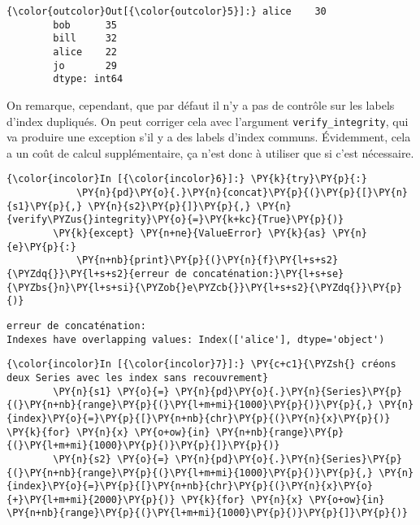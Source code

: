 \begin{Verbatim}[commandchars=\\\{\}]
{\color{outcolor}Out[{\color{outcolor}5}]:} alice    30
        bob      35
        bill     32
        alice    22
        jo       29
        dtype: int64
\end{Verbatim}
            
    On remarque, cependant, que par défaut il n'y a pas de contrôle sur les
labels d'index dupliqués. On peut corriger cela avec l'argument
\texttt{verify\_integrity}, qui va produire une exception s'il y a des
labels d'index communs. Évidemment, cela a un coût de calcul
supplémentaire, ça n'est donc à utiliser que si c'est nécessaire.

    \begin{Verbatim}[commandchars=\\\{\}]
{\color{incolor}In [{\color{incolor}6}]:} \PY{k}{try}\PY{p}{:}
            \PY{n}{pd}\PY{o}{.}\PY{n}{concat}\PY{p}{(}\PY{p}{[}\PY{n}{s1}\PY{p}{,} \PY{n}{s2}\PY{p}{]}\PY{p}{,} \PY{n}{verify\PYZus{}integrity}\PY{o}{=}\PY{k+kc}{True}\PY{p}{)}
        \PY{k}{except} \PY{n+ne}{ValueError} \PY{k}{as} \PY{n}{e}\PY{p}{:}
            \PY{n+nb}{print}\PY{p}{(}\PY{n}{f}\PY{l+s+s2}{\PYZdq{}}\PY{l+s+s2}{erreur de concaténation:}\PY{l+s+se}{\PYZbs{}n}\PY{l+s+si}{\PYZob{}e\PYZcb{}}\PY{l+s+s2}{\PYZdq{}}\PY{p}{)}
\end{Verbatim}


    \begin{Verbatim}[commandchars=\\\{\}]
erreur de concaténation:
Indexes have overlapping values: Index(['alice'], dtype='object')

    \end{Verbatim}

    \begin{Verbatim}[commandchars=\\\{\}]
{\color{incolor}In [{\color{incolor}7}]:} \PY{c+c1}{\PYZsh{} créons deux Series avec les index sans recouvrement}
        \PY{n}{s1} \PY{o}{=} \PY{n}{pd}\PY{o}{.}\PY{n}{Series}\PY{p}{(}\PY{n+nb}{range}\PY{p}{(}\PY{l+m+mi}{1000}\PY{p}{)}\PY{p}{,} \PY{n}{index}\PY{o}{=}\PY{p}{[}\PY{n+nb}{chr}\PY{p}{(}\PY{n}{x}\PY{p}{)} \PY{k}{for} \PY{n}{x} \PY{o+ow}{in} \PY{n+nb}{range}\PY{p}{(}\PY{l+m+mi}{1000}\PY{p}{)}\PY{p}{]}\PY{p}{)}
        \PY{n}{s2} \PY{o}{=} \PY{n}{pd}\PY{o}{.}\PY{n}{Series}\PY{p}{(}\PY{n+nb}{range}\PY{p}{(}\PY{l+m+mi}{1000}\PY{p}{)}\PY{p}{,} \PY{n}{index}\PY{o}{=}\PY{p}{[}\PY{n+nb}{chr}\PY{p}{(}\PY{n}{x}\PY{o}{+}\PY{l+m+mi}{2000}\PY{p}{)} \PY{k}{for} \PY{n}{x} \PY{o+ow}{in} \PY{n+nb}{range}\PY{p}{(}\PY{l+m+mi}{1000}\PY{p}{)}\PY{p}{]}\PY{p}{)}
\end{Verbatim}



